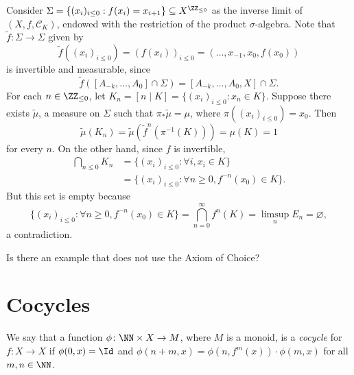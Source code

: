 \documentclass[../main]{subfiles}
\begin{document}
\begin{example}
  Consider \(\Sigma = \{ (x_i)_{i \leq 0} : f(x_i) = x_{i + 1} \} \subseteq X^{\ZZ_{\le 0}}\) as the inverse limit of \((X,f,\mathcal{C}_K)\), endowed with the restriction of the product \(\sigma\)-algebra. Note that \(\tilde{f} \colon \Sigma \to \Sigma\) given by
  \[
    \tilde{f}((x_i)_{i \leq 0}) = (f(x_i))_{i \leq 0} = (\dots, x_{-1}, x_0, f(x_0))
  \]
  is invertible and measurable, since
  \[
    \tilde{f}([A_{-k}, \dots, A_0] \cap \Sigma) = [A_{-k}, \dots, A_0, X] \cap \Sigma.
  \]
  For each \(n \in \ZZ_{\leq 0}\), let \(K_n = [n \mid K] =  \{ (x_i)_{i \leq 0} : x_n \in K \}\). Suppose there exists \(\tilde{\mu}\), a measure on \(\Sigma\) such that \(\pi_* \tilde{\mu} = \mu\), where \(\pi((x_i)_{i \leq 0}) = x_0\). Then
  \begin{equation*}
    \tilde{\mu}(K_n) = \tilde{\mu}(\tilde{f}^n(\pi^{-1}(K))) = \mu(K) = 1
  \end{equation*}
  for every \(n\). On the other hand, since \(f\) is invertible,
  \begin{align*}
    \bigcap_{n \leq 0} K_n &= \{ (x_i)_{i \leq 0} : \forall i, x_i \in K \} \\
                           &= \{ (x_i)_{i \leq 0} : \forall n \geq 0, f^{-n}(x_0) \in K \}.
  \end{align*}
  But this set is empty because
  \begin{equation*}
    \{ (x_i)_{i \leq 0} : \forall n \geq 0, f^{-n}(x_0) \in K \} = \bigcap_{n = 0}^{\infty} f^n(K) = \limsup_n E_n =  \varnothing,
  \end{equation*}
  a contradiction.
\end{example}

\begin{question}
  Is there an example that does not use the Axiom of Choice?
\end{question}



\section{Cocycles}

\begin{definition}
  We say that a function \(\phi \colon \NN \times X \to M\), where \(M\) is a monoid, is a \emph{cocycle} for \(f \colon X \to X\) if \(\phi(0,x) = \Id\) and \(\phi(n + m,x) = \phi(n,f^m(x)) \cdot \phi(m,x)\) for all \(m,n \in \NN\).
\end{definition}
\end{document}
